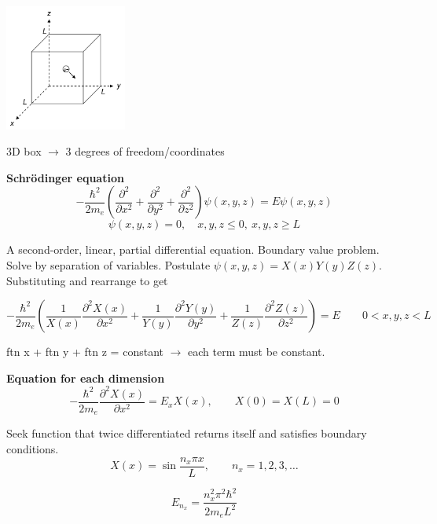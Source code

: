 \documentclass[11pt]{article}
\begin{document}
\begin{center}
\includegraphics[width=0.3\textwidth]{./Images/Cube.png}
\end{center}

3D box $\rightarrow$ 3 degrees of freedom/coordinates

\textbf{Schr\"{o}dinger equation}
\begin{equation}
-\frac{\hbar^2}{2m_e} \left ( \frac{\partial^2 }{\partial x^2} + \frac{\partial^2 }{\partial y^2} + \frac{\partial^2 }{\partial z^2} \right ) \psi(x,y,z) = E \psi(x,y,z)
\end{equation}
\begin{equation}
\psi(x,y,z) = 0, \quad x,y,z \leq 0,\ x,y,z \geq L
\end{equation}

A second-order, linear, partial differential equation.  Boundary value problem.
Solve by separation of variables.  Postulate $\psi(x,y,z) = X(x)Y(y)Z(z)$.
Substituting and rearrange to get

\begin{equation}
-\frac{\hbar^2}{2m_e} \left (\frac{1}{X(x)}\frac{\partial^2 X(x)}{\partial x^2} + \frac{1}{Y(y)}\frac{\partial^2 Y(y)}{\partial y^2} + \frac{1}{Z(z)}\frac{\partial^2 Z(z)}{\partial z^2} \right ) = E \qquad 0 < x,y,z <L
\end{equation}

ftn x + ftn y + ftn z = constant $\rightarrow$ each term must be constant.

\textbf{Equation for each dimension}
\begin{equation}
-\frac{\hbar^2}{2m_e}\frac{\partial^2 X(x)}{\partial x^2} = E_x X(x), \qquad X(0)=X(L) = 0
\end{equation}

Seek function that twice differentiated returns itself and satisfies
boundary conditions.
\begin{equation}
X(x) = \sin\frac{n_x\pi x}{L},\qquad n_x = 1,2,3,\ldots
\end{equation}

\begin{equation}
E_{n_x} = \frac{n_x^2\pi^2\hbar^2}{2 m_e L^2}
\end{equation}
\end{document}
